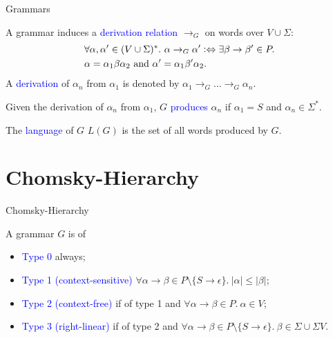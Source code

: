 \documentclass{beamer}
\newcommand\logeq{\mathrel{\vcentcolon\Leftrightarrow}}
\def\b{\textcolor{blue}}
\begin{document}
\begin{frame}{Grammars}
    \begin{definition}[Derivation]
        A grammar induces a \b{derivation relation} $\rightarrow_G$ on words over $V \cup \Sigma$:\pause
        \begin{align*}
            &\forall \alpha, \alpha' \in (V \cup \Sigma)^*.\ \alpha \rightarrow_G \alpha' \logeq \exists \beta \to \beta' \in P.\\
            &\alpha = \alpha_1\beta\alpha_2 \text{ and } \alpha' = \alpha_1\beta'\alpha_2.
        \end{align*}\pause
        A \b{derivation} of $\alpha_n$ from $\alpha_1$ is denoted by $\alpha_1 \rightarrow_G \dots \rightarrow_G \alpha_n$.
    \end{definition}\pause
    \begin{definition}
        Given the derivation of $\alpha_n$ from $\alpha_1$, $G$ \b{produces} $\alpha_n$ if $\alpha_1 = S$ and $\alpha_n \in \Sigma^*$.\pause\par
        The \b{language} of $G$ $L(G)$ is the set of all words produced by $G$.
    \end{definition}
\end{frame}

\section{Chomsky-Hierarchy}

\begin{frame}{Chomsky-Hierarchy}
    \begin{definition}
        A grammar $G$ is of\pause
        \begin{itemize}
            \item \b{Type 0} always;\pause
            \item \b{Type 1 (context-sensitive)} $\forall \alpha \to \beta \in P\setminus\{S \to \epsilon\}.\ |\alpha| \leq |\beta|$;\pause
            \item \b{Type 2 (context-free)} if of type 1 and $\forall \alpha \to \beta \in P.\ \alpha \in V$;\pause
            \item \b{Type 3 (right-linear)} if of type 2 and $\forall \alpha \to \beta \in P\setminus\{S \to \epsilon\}.\ \beta \in \Sigma \cup \Sigma V$.
        \end{itemize}
    \end{definition}
\end{frame}
\end{document}
